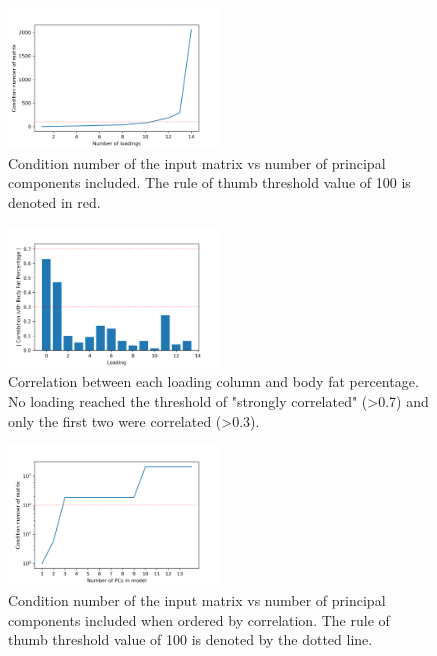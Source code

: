 \documentclass{IEEEtran}
\begin{document}
\begin{centering}
\begin{figure}
\centering
\begin{center}
	\includegraphics[width=0.5\textwidth]{condition_number}
	\caption{Condition number of the input matrix vs number of principal components included. The rule of thumb threshold value of 100 is denoted in red.\label{fig:condition_number}}
\end{center}
\end{figure}
\end{centering}

\begin{centering}
\begin{figure}
\centering
\begin{center}
	\includegraphics[width=0.5\textwidth]{pca_correlation}
	\caption{Correlation between each loading column and body fat percentage. No loading reached the threshold of "strongly correlated" (\textgreater0.7) and only the first two were correlated (\textgreater0.3).\label{fig:pca_correlation}}
\end{center}
\end{figure}
\end{centering}

\begin{centering}
\begin{figure}
\centering
\begin{center}
	\includegraphics[width=0.5\textwidth]{condition_number_corr_ordered}
	\caption{Condition number of the input matrix vs number of principal components included when ordered by correlation. The rule of thumb threshold value of 100 is denoted by the dotted line.\label{fig:condition_number_corr_ordered}}
\end{center}
\end{figure}
\end{centering}
\end{document}
